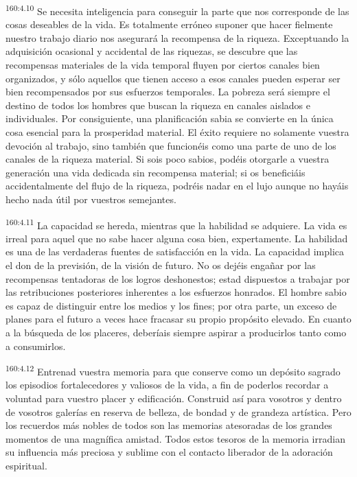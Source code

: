 \par 
\textsuperscript{160:4.10} Se necesita inteligencia para conseguir la parte que nos corresponde de las cosas deseables de la vida. Es totalmente erróneo suponer que hacer fielmente nuestro trabajo diario nos asegurará la recompensa de la riqueza. Exceptuando la adquisición ocasional y accidental de las riquezas, se descubre que las recompensas materiales de la vida temporal fluyen por ciertos canales bien organizados, y sólo aquellos que tienen acceso a esos canales pueden esperar ser bien recompensados por sus esfuerzos temporales. La pobreza será siempre el destino de todos los hombres que buscan la riqueza en canales aislados e individuales. Por consiguiente, una planificación sabia se convierte en la única cosa esencial para la prosperidad material. El éxito requiere no solamente vuestra devoción al trabajo, sino también que funcionéis como una parte de uno de los canales de la riqueza material. Si sois poco sabios, podéis otorgarle a vuestra generación una vida dedicada sin recompensa material; si os beneficiáis accidentalmente del flujo de la riqueza, podréis nadar en el lujo aunque no hayáis hecho nada útil por vuestros semejantes.

\par 
\textsuperscript{160:4.11} La capacidad se hereda, mientras que la habilidad se adquiere. La vida es irreal para aquel que no sabe hacer alguna cosa bien, expertamente. La habilidad es una de las verdaderas fuentes de satisfacción en la vida. La capacidad implica el don de la previsión, de la visión de futuro. No os dejéis engañar por las recompensas tentadoras de los logros deshonestos; estad dispuestos a trabajar por las retribuciones posteriores inherentes a los esfuerzos honrados. El hombre sabio es capaz de distinguir entre los medios y los fines; por otra parte, un exceso de planes para el futuro a veces hace fracasar su propio propósito elevado. En cuanto a la búsqueda de los placeres, deberíais siempre aspirar a producirlos tanto como a consumirlos.

\par 
\textsuperscript{160:4.12} Entrenad vuestra memoria para que conserve como un depósito sagrado los episodios fortalecedores y valiosos de la vida, a fin de poderlos recordar a voluntad para vuestro placer y edificación. Construid así para vosotros y dentro de vosotros galerías en reserva de belleza, de bondad y de grandeza artística. Pero los recuerdos más nobles de todos son las memorias atesoradas de los grandes momentos de una magnífica amistad. Todos estos tesoros de la memoria irradian su influencia más preciosa y sublime con el contacto liberador de la adoración espiritual.


